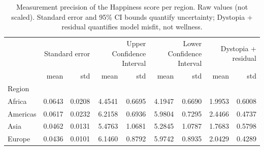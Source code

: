 \begin{table}
\caption{Measurement precision of the Happiness score per region. Raw values (not scaled). Standard error and 95\% CI bounds quantify uncertainty; Dystopia + residual quantifies model misfit, not wellness.}
\label{tab:precision-region}
\begin{tabular}{lrrrrrrrr}
\toprule
 & \multicolumn{2}{r}{Standard error} & \multicolumn{2}{r}{Upper Confidence Interval} & \multicolumn{2}{r}{Lower Confidence Interval} & \multicolumn{2}{r}{Dystopia + residual} \\
 & mean & std & mean & std & mean & std & mean & std \\
Region &  &  &  &  &  &  &  &  \\
\midrule
Africa & 0.0643 & 0.0208 & 4.4541 & 0.6695 & 4.1947 & 0.6690 & 1.9953 & 0.6008 \\
Americas & 0.0617 & 0.0232 & 6.2158 & 0.6936 & 5.9804 & 0.7295 & 2.4466 & 0.4737 \\
Asia & 0.0462 & 0.0131 & 5.4763 & 1.0681 & 5.2845 & 1.0787 & 1.7683 & 0.5798 \\
Europe & 0.0436 & 0.0101 & 6.1460 & 0.8792 & 5.9742 & 0.8935 & 2.0429 & 0.4289 \\
\bottomrule
\end{tabular}
\end{table}

